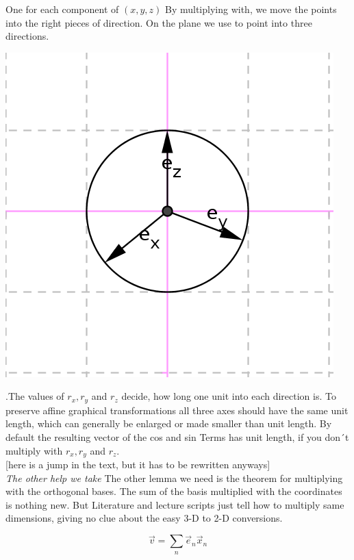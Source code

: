 \documentclass{article}
\begin{document}
One for each component of $(x,y,z)$ By multiplying with, we move the 
points into the right pieces of direction. On the plane we use to point into three directions.\\

\begin{center}
\includegraphics[scale=1]{unitvectors.png}
\end{center}

.The values of $r_x, r_y$ and $r_z$ decide, how long one unit into each
direction is. To preserve affine graphical transformations all three
axes should have the same unit length, which can generally be enlarged
or made smaller than unit length. By default the resulting vector of the cos 
and sin Terms has unit length, if you don´t multiply with $r_x, r_y$ and $r_z$. \\

[here is a jump in the text, but it has to be rewritten anyways]\\

\emph{The other help we take} The other lemma we need is the theorem for 
multiplying with the orthogonal bases.
The sum of the basis multiplied with the coordinates is nothing
new. But Literature and lecture scripts just tell how to multiply
same dimensions, giving no clue about the easy 3-D to 2-D conversions.

\begin{displaymath}
\vec{v} = \displaystyle\sum_{n} \vec{e}_n\vec{x}_n
\end{displaymath}
\end{document}
